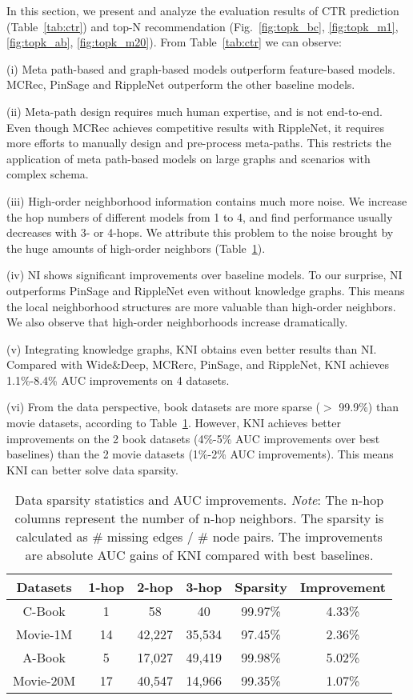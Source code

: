 \documentclass[sigconf]{acmart}
\newcommand{\new}[1]{{\color{black} #1}}
\begin{document}
In this section, we present and analyze the evaluation results of CTR prediction (Table~\ref{tab:ctr}) and top-N recommendation (Fig.~\ref{fig:topk_bc}, \ref{fig:topk_m1}, \ref{fig:topk_ab}, \ref{fig:topk_m20}).
From Table~\ref{tab:ctr} we can observe:

(i) Meta path-based and graph-based models outperform feature-based models. MCRec, PinSage and RippleNet outperform the other baseline models. 

(ii) Meta-path design requires much human expertise, and is not end-to-end. 
Even though MCRec achieves competitive results with RippleNet, it requires more efforts to manually design and pre-process meta-paths. This restricts the application of meta path-based models on large graphs and scenarios with complex schema.

(iii) High-order neighborhood information contains much more noise. 
We increase the hop numbers of different models from 1 to 4, and find performance usually decreases with 3- or 4-hops.
We attribute this problem to the noise brought by the huge amounts of high-order neighbors (Table~\ref{tab:sp}). 

(iv) NI shows significant improvements over baseline models. To our surprise, NI outperforms PinSage and RippleNet even without knowledge graphs. \new{This means the local neighborhood structures are more valuable than high-order neighbors. We also observe that high-order neighborhoods increase dramatically.}

(v) Integrating knowledge graphs, KNI obtains even better results than NI. \new{Compared with Wide\&Deep, MCRerc, PinSage, and RippleNet, KNI achieves 1.1\%-8.4\% AUC improvements on 4 datasets.} 

(vi) \new{From the data perspective, book datasets are more sparse ($>$ 99.9\%) than movie datasets, according to Table~\ref{tab:sp}. However, KNI achieves better improvements on the 2 book datasets (4\%-5\% AUC improvements over best baselines) than the 2 movie datasets (1\%-2\% AUC improvements). This means KNI can better solve data sparsity.}

\begin{table}
    \centering
    \caption{Data sparsity statistics and AUC improvements. \emph{Note}: The n-hop columns represent the number of n-hop neighbors. The sparsity is calculated as \# missing edges / \# node pairs. The improvements are absolute AUC gains of KNI compared with best baselines.} \label{tab:sp}
    \small
    \begin{tabular}{c|ccc|cc} \hline
    Datasets& 1-hop & 2-hop & 3-hop & Sparsity & Improvement \\ \hline\hline
    C-Book & 1 & 58 & 40 & 99.97\% & 4.33\% \\
    Movie-1M & 14 & 42,227 & 35,534 & 97.45\% & 2.36\% \\
    A-Book & 5 & 17,027 & 49,419 & 99.98\% & 5.02\%\\
    Movie-20M & 17 & 40,547 & 14,966 & 99.35\% & 1.07\% \\ \hline
    \end{tabular}
\end{table}
\end{document}
